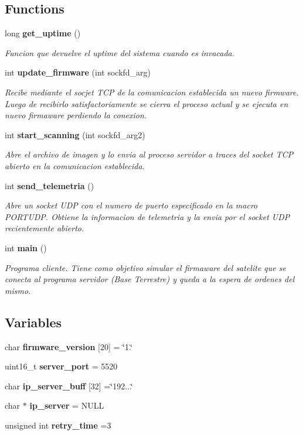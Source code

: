 \subsection*{Functions}
\begin{DoxyCompactItemize}
\item 
long {\bf get\+\_\+uptime} ()
\begin{DoxyCompactList}\small\item\em Funcion que devuelve el uptime del sistema cuando es invacada. \end{DoxyCompactList}\item 
int {\bf update\+\_\+firmware} (int sockfd\+\_\+arg)
\begin{DoxyCompactList}\small\item\em Recibe mediante el socjet T\+CP de la comunicacion establecida un nuevo firmware. Luego de recibirlo satisfactoriamente se cierra el proceso actual y se ejecuta en nuevo firmaware perdiendo la conexion. \end{DoxyCompactList}\item 
int {\bf start\+\_\+scanning} (int sockfd\+\_\+arg2)
\begin{DoxyCompactList}\small\item\em Abre el archivo de imagen y lo envia al proceso servidor a traces del socket T\+CP abierto en la comunicacion establecida. \end{DoxyCompactList}\item 
int {\bf send\+\_\+telemetria} ()
\begin{DoxyCompactList}\small\item\em Abre un socket U\+DP con el numero de puerto especificado en la macro P\+O\+R\+T\+U\+DP. Obtiene la informacion de telemetria y la envia por el socket U\+DP recientemente abierto. \end{DoxyCompactList}\item 
int {\bf main} ()
\begin{DoxyCompactList}\small\item\em Programa cliente. Tiene como objetivo simular el firmaware del satelite que se conecta al programa servidor (Base Terrestre) y queda a la espera de ordenes del mismo. \end{DoxyCompactList}\end{DoxyCompactItemize}
\subsection*{Variables}
\begin{DoxyCompactItemize}
\item 
char {\bf firmware\+\_\+version} [20] = \char`\"{}1.\char`\"{}
\item 
uint16\+\_\+t {\bf server\+\_\+port} = 5520
\item 
char {\bf ip\+\_\+server\+\_\+buff} [32] =\char`\"{}192...\char`\"{}
\item 
char $\ast$ {\bf ip\+\_\+server} = N\+U\+LL
\item 
unsigned int {\bf retry\+\_\+time} =3
\end{DoxyCompactItemize}



